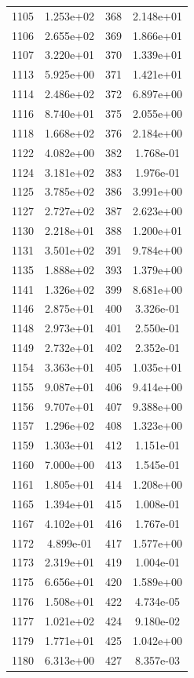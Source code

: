 \documentclass[12pt]{article}
\begin{document}
\begin{longtable}{@{}cccc@{}}
1105 & 1.253e+02 & 368 & 2.148e+01 \\
1106 & 2.655e+02 & 369 & 1.866e+01 \\
1107 & 3.220e+01 & 370 & 1.339e+01 \\
1113 & 5.925e+00 & 371 & 1.421e+01 \\
1114 & 2.486e+02 & 372 & 6.897e+00 \\
1116 & 8.740e+01 & 375 & 2.055e+00 \\
1118 & 1.668e+02 & 376 & 2.184e+00 \\
1122 & 4.082e+00 & 382 & 1.768e-01 \\
1124 & 3.181e+02 & 383 & 1.976e-01 \\
1125 & 3.785e+02 & 386 & 3.991e+00 \\
1127 & 2.727e+02 & 387 & 2.623e+00 \\
1130 & 2.218e+01 & 388 & 1.200e+01 \\
1131 & 3.501e+02 & 391 & 9.784e+00 \\
1135 & 1.888e+02 & 393 & 1.379e+00 \\
1141 & 1.326e+02 & 399 & 8.681e+00 \\
1146 & 2.875e+01 & 400 & 3.326e-01 \\
1148 & 2.973e+01 & 401 & 2.550e-01 \\
1149 & 2.732e+01 & 402 & 2.352e-01 \\
1154 & 3.363e+01 & 405 & 1.035e+01 \\
1155 & 9.087e+01 & 406 & 9.414e+00 \\
1156 & 9.707e+01 & 407 & 9.388e+00 \\
1157 & 1.296e+02 & 408 & 1.323e+00 \\
1159 & 1.303e+01 & 412 & 1.151e-01 \\
1160 & 7.000e+00 & 413 & 1.545e-01 \\
1161 & 1.805e+01 & 414 & 1.208e+00 \\
1165 & 1.394e+01 & 415 & 1.008e-01 \\
1167 & 4.102e+01 & 416 & 1.767e-01 \\
1172 & 4.899e-01 & 417 & 1.577e+00 \\
1173 & 2.319e+01 & 419 & 1.004e-01 \\
1175 & 6.656e+01 & 420 & 1.589e+00 \\
1176 & 1.508e+01 & 422 & 4.734e-05 \\
1177 & 1.021e+02 & 424 & 9.180e-02 \\
1179 & 1.771e+01 & 425 & 1.042e+00 \\
1180 & 6.313e+00 & 427 & 8.357e-03 \\

\end{longtable}
\end{document}
